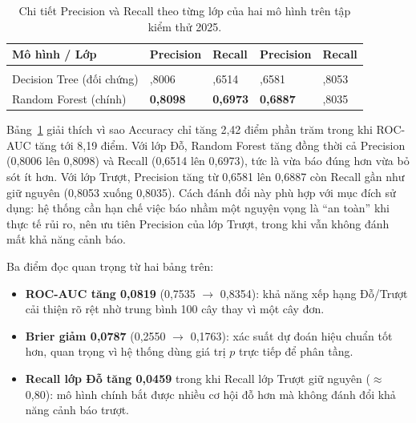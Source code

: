 \begin{table}[H]
\centering
\caption{Chi tiết Precision và Recall theo từng lớp của hai mô hình trên tập kiểm thử 2025.}
\label{tab:chi-tiet-lop}
\small
\begin{tabularx}{\textwidth}{@{}>{\raggedright\arraybackslash}p{3.5cm}
  >{\centering\arraybackslash}p{2.4cm}
  >{\centering\arraybackslash}p{2.4cm}
  >{\centering\arraybackslash}p{2.4cm}
  >{\centering\arraybackslash}p{2.4cm}@{}}
\toprule
\rowcolor{gray100}\bfseries\color{daunavy}Mô hình / Lớp &
\bfseries\color{daumaroon}Precision &
\bfseries\color{daumaroon}Recall &
\bfseries\color{daunavy}Precision &
\bfseries\color{daunavy}Recall \\
\midrule
 & \multicolumn{2}{c}{\bfseries\color{daumaroon}Lớp Đỗ} & \multicolumn{2}{c}{\bfseries\color{daunavy}Lớp Trượt} \\
\midrule
Decision Tree (đối chứng) & 0,8006 & 0,6514 & 0,6581 & 0,8053 \\
Random Forest (chính)     & \textbf{0,8098} & \textbf{0,6973} & \textbf{0,6887} & 0,8035 \\
\bottomrule
\end{tabularx}
\end{table}

Bảng~\ref{tab:chi-tiet-lop} giải thích vì sao Accuracy chỉ tăng 2,42 điểm phần trăm
trong khi ROC-AUC tăng tới 8,19 điểm. Với lớp Đỗ, Random Forest tăng đồng thời cả
Precision (0,8006 lên 0,8098) và Recall (0,6514 lên 0,6973), tức là vừa báo đúng hơn
vừa bỏ sót ít hơn. Với lớp Trượt, Precision tăng từ 0,6581 lên 0,6887 còn Recall gần
như giữ nguyên (0,8053 xuống 0,8035). Cách đánh đổi này phù hợp với mục đích sử dụng:
hệ thống cần hạn chế việc báo nhầm một nguyện vọng là ``an toàn'' khi thực tế rủi ro,
nên ưu tiên Precision của lớp Trượt, trong khi vẫn không đánh mất khả năng cảnh báo.

Ba điểm đọc quan trọng từ hai bảng trên:
\begin{itemize}[leftmargin=1.6em, itemsep=2pt]
  \item \textbf{ROC-AUC tăng 0,0819} (0,7535 $\rightarrow$ 0,8354): khả năng xếp hạng Đỗ/Trượt cải thiện rõ rệt nhờ trung bình 100 cây thay vì một cây đơn.
  \item \textbf{Brier giảm 0,0787} (0,2550 $\rightarrow$ 0,1763): xác suất dự đoán hiệu chuẩn tốt hơn, quan trọng vì hệ thống dùng giá trị $p$ trực tiếp để phân tầng.
  \item \textbf{Recall lớp Đỗ tăng 0,0459} trong khi Recall lớp Trượt giữ nguyên ($\approx$ 0,80): mô hình chính bắt được nhiều cơ hội đỗ hơn mà không đánh đổi khả năng cảnh báo trượt.
\end{itemize}

